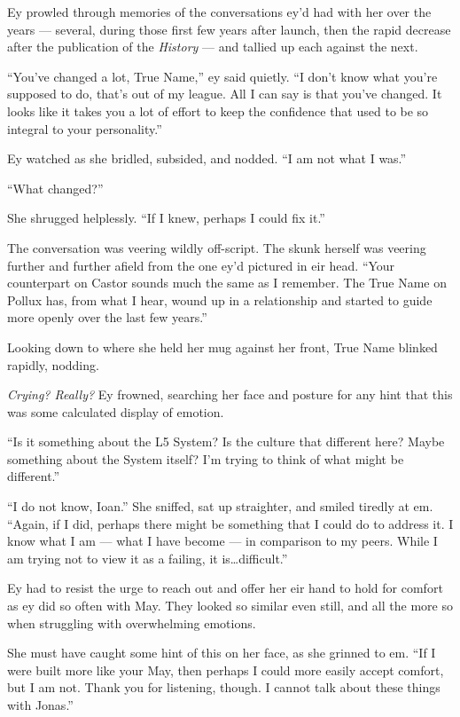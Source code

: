 Ey prowled through memories of the conversations ey'd had with her over the years — several, during those first few years after launch, then the rapid decrease after the publication of the \emph{History} — and tallied up each against the next.

``You've changed a lot, True Name,'' ey said quietly. ``I don't know what you're supposed to do, that's out of my league. All I can say is that you've changed. It looks like it takes you a lot of effort to keep the confidence that used to be so integral to your personality.''

Ey watched as she bridled, subsided, and nodded. ``I am not what I was.''

``What changed?''

She shrugged helplessly. ``If I knew, perhaps I could fix it.''

The conversation was veering wildly off-script. The skunk herself was veering further and further afield from the one ey'd pictured in eir head. ``Your counterpart on Castor sounds much the same as I remember. The True Name on Pollux has, from what I hear, wound up in a relationship and started to guide more openly over the last few years.''

Looking down to where she held her mug against her front, True Name blinked rapidly, nodding.

\emph{Crying? Really?} Ey frowned, searching her face and posture for any hint that this was some calculated display of emotion.

``Is it something about the L5 System? Is the culture that different here? Maybe something about the System itself? I'm trying to think of what might be different.''

``I do not know, Ioan.'' She sniffed, sat up straighter, and smiled tiredly at em. ``Again, if I did, perhaps there might be something that I could do to address it. I know what I am — what I have become — in comparison to my peers. While I am trying not to view it as a failing, it is\ldots difficult.''

Ey had to resist the urge to reach out and offer her eir hand to hold for comfort as ey did so often with May. They looked so similar even still, and all the more so when struggling with overwhelming emotions.

She must have caught some hint of this on her face, as she grinned to em. ``If I were built more like your May, then perhaps I could more easily accept comfort, but I am not. Thank you for listening, though. I cannot talk about these things with Jonas.''

